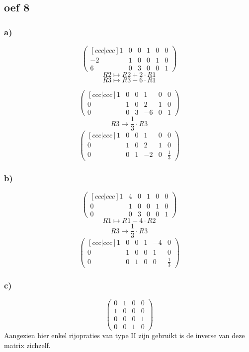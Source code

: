 \documentclass[lineaire_algebra_oplossingen.tex]{subfiles}
\begin{document}
\subsection{oef 8}
\subsubsection*{a)}
$$
\begin{pmatrix}[ccc|ccc]
 1 & 0 & 0 & 1 & 0 & 0\\
-2 & 1 & 0 & 0 & 1 & 0\\ 
 6 & 0 & 3 & 0 & 0 & 1 
\end{pmatrix}
$$
$$R2 \longmapsto R2 + 2\cdot R1$$
$$R3 \longmapsto R3 - 6\cdot R1$$

$$
\begin{pmatrix}[ccc|ccc]
 1 & 0 & 0 & 1 & 0 & 0\\
 0 & 1 & 0 & 2 & 1 & 0\\ 
 0 & 0 & 3 & -6 & 0 & 1 
\end{pmatrix}
$$
$$R3 \longmapsto \frac{1}{3}\cdot R3$$
$$
\begin{pmatrix}[ccc|ccc]
 1 & 0 & 0 & 1 & 0 & 0\\
 0 & 1 & 0 & 2 & 1 & 0\\ 
 0 & 0 & 1 & -2 & 0 & \frac{1}{3} 
\end{pmatrix}
$$
\subsubsection*{b)}

$$
\begin{pmatrix}[ccc|ccc]
1 & 4 & 0 & 1 & 0 & 0\\
0 & 1 & 0 & 0 & 1 & 0\\
0 & 0 & 3 & 0 & 0 & 1
\end{pmatrix}
$$
$$R1 \longmapsto R1 - 4\cdot R2$$
$$R3 \longmapsto \frac{1}{3}\cdot R3$$
$$
\begin{pmatrix}[ccc|ccc]
1 & 0 & 0 & 1 & -4 & 0\\
0 & 1 & 0 & 0 & 1 & 0\\
0 & 0 & 1 & 0 & 0 & \frac{1}{3}
\end{pmatrix}
$$

\subsubsection*{c)}
$$
\begin{pmatrix}
0 & 1 & 0 & 0\\
1 & 0 & 0 & 0\\
0 & 0 & 0 & 1\\
0 & 0 & 1 & 0
\end{pmatrix}
$$
Aangezien hier enkel rijopraties van type II zijn gebruikt is de inverse van deze matrix zichzelf.
\end{document}
